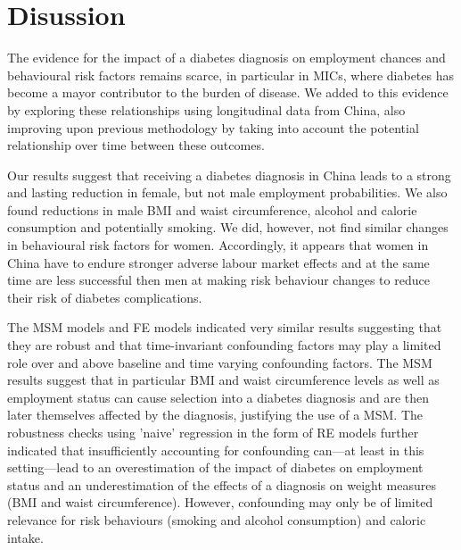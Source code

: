 \begin{landscape}
\begin{figure}
\begin{center}
\end{center}
\end{figure}
\end{landscape}




\FloatBarrier


\section{\label{sec:Discussion5}Disussion}

The evidence for the impact of a diabetes diagnosis on employment chances and behavioural risk factors remains scarce, in particular in \acp{MIC}, where diabetes has become a mayor contributor to the burden of disease. We added to this evidence by exploring these relationships using longitudinal data from China, also improving upon previous methodology by taking into account the potential relationship over time between these outcomes.

Our results suggest that receiving a diabetes diagnosis in China leads to a strong and lasting reduction in female, but not male employment probabilities. We also found reductions in male \ac{BMI} and waist circumference, alcohol and calorie consumption and potentially smoking. We did, however, not find similar changes in behavioural risk factors for women. Accordingly, it appears that women in China have to endure stronger adverse labour market effects and at the same time are less successful then men at making risk behaviour changes to reduce their risk of diabetes complications.

The \ac{MSM} models and \ac{FE} models indicated very similar results suggesting that they are robust and that time-invariant confounding factors may play a limited role over and above baseline and time varying confounding factors. The \ac{MSM} results suggest that in particular \ac{BMI} and waist circumference levels as well as employment status can cause selection into a diabetes diagnosis and are then later themselves affected by the diagnosis, justifying the use of a \ac{MSM}. The robustness checks using 'naive' regression in the form of \ac{RE} models further indicated that insufficiently accounting for confounding can---at least in this setting---lead to an overestimation of the impact of diabetes on employment status and an underestimation of the effects of a diagnosis on weight measures (\ac{BMI} and waist circumference). However, confounding may only be of limited relevance for risk behaviours (smoking and alcohol consumption) and caloric intake.

